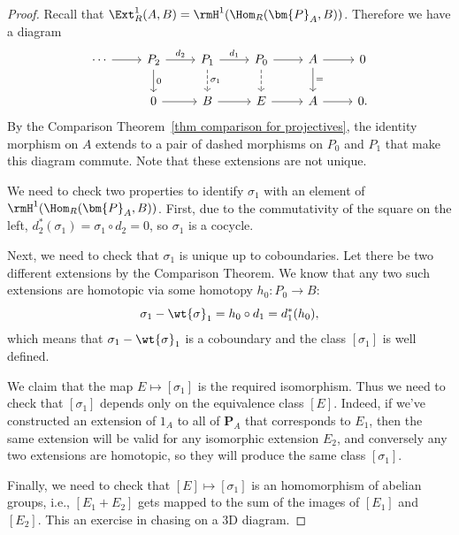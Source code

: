 \begin{proof}
    Recall that $\Ext^1_R(A,B)=\rmH^1(\Hom_R(\bm{P}_A,B))$. Therefore we have a diagram
    \[\begin{tikzcd}
        \cdots \arrow[r]&P_2\arrow[r,"d_2"]\arrow[d,"0"] & P_1\arrow[r,"d_1"]\arrow[d,dashed,"\sigma_1"] & P_0 \arrow[r]\arrow[d,dashed] & A\arrow[r]\arrow[d,"="] & 0 \\
        & 0\arrow[r] & B\arrow[r] & E \arrow[r] & A\arrow[r] & 0.
    \end{tikzcd}\]
    By the Comparison Theorem~\ref{thm comparison for projectives}, the identity morphism on $A$ extends to a pair of dashed morphisms on $P_0$ and $P_1$ that make this diagram commute. Note that these extensions are not unique. 

    We need to check two properties to identify $\sigma_1$ with an element of $\rmH^1(\Hom_R(\bm{P}_A,B))$. First, due to the commutativity of the square on the left, $d_2^\ast(\sigma_1)=\sigma_1\circ d_2=0$, so $\sigma_1$ is a cocycle. 

    Next, we need to check that $\sigma_1$ is unique up to coboundaries. Let there be two different extensions by the Comparison Theorem. We know that any two such extensions are homotopic via some homotopy $h_0:P_0\to B$:
    \[\sigma_1-\wt{\sigma}_1=h_0\circ d_1=d_1^\ast(h_0),\]
    which means that $\sigma_1-\wt{\sigma}_1$ is a coboundary and the class $[\sigma_1]$ is well defined.

    We claim that the map $E\mapsto [\sigma_1]$ is the required isomorphism. Thus we need to check that $[\sigma_1]$ depends only on the equivalence class $[E]$. Indeed, if we've constructed an extension of $1_A$ to all of $\bm{P}_A$ that corresponds to $E_1$, then the same extension will be valid for any isomorphic extension $E_2$, and conversely any two extensions are homotopic, so they will produce the same class $[\sigma_1]$.

    Finally, we need to check that $[E]\mapsto [\sigma_1]$ is an homomorphism of abelian groups, i.e., $[E_1+E_2]$ gets mapped to the sum of the images of $[E_1]$ and $[E_2]$. This an exercise in chasing on a 3D diagram.


\end{proof}
